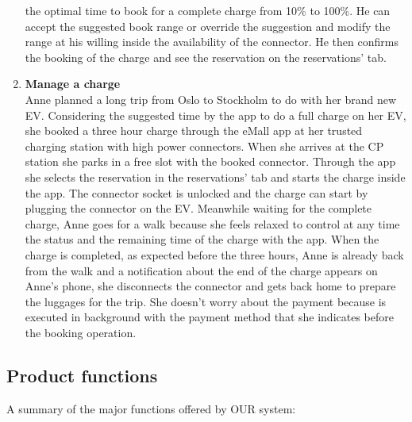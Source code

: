 \begin{enumerate}[label=\textbf{\Alph*}.]
            the optimal time to book for a complete charge from 10\% to 100\%.
            He can accept the suggested book range or override the suggestion and modify the range at his willing inside the
            availability of the connector. He then confirms the booking of the charge and see the reservation on the reservations' tab.
      \item \textbf{Manage a charge} \\
            Anne planned a long trip from Oslo to Stockholm to do with her brand new EV. 
            Considering the suggested time by the app to do a full charge on her EV, she booked a three hour charge through the eMall 
            app at her trusted charging station with high power connectors.
            When she arrives at the CP station she parks in a free slot with the booked connector. Through the app she selects
            the reservation in the reservations' tab and starts the charge inside the app. The connector socket is unlocked and
            the charge can start by plugging the connector on the EV. Meanwhile waiting for the complete charge, Anne goes for a walk
            because she feels relaxed to control at any time the status and the remaining time of the charge with the app. When the charge
            is completed, as expected before the three hours, Anne is already back from the walk and a notification about the end of the charge 
            appears on Anne's phone, she disconnects the connector and gets back home to prepare the luggages for the trip. She doesn't worry about 
            the payment because is executed in background with the payment method that she indicates before the booking operation.
\end{enumerate}

\subsection{Product functions}
A summary of the major functions offered by OUR system:

